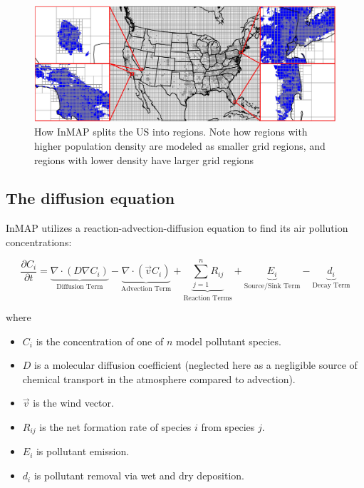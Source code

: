 \documentclass{article}
\begin{document}
\begin{figure}[h]
    \centering
    \includegraphics[width=\textwidth]{inmap.png}
    \caption{How InMAP splits the US into regions. Note how regions with higher population density are modeled as smaller grid
    regions, and regions with lower density have larger grid regions}
    \label{fig:grid}
 \end{figure}

\subsection{The diffusion equation}

InMAP utilizes a reaction-advection-diffusion equation to find its air pollution concentrations:

\begin{equation}
    \frac{\partial C_i}{\partial t} = \underbrace{\nabla \cdot (D\nabla C_i)}_{\text{Diffusion Term}} - \underbrace{\nabla \cdot (\vec{v}C_i)}_{\text{Advection Term}} + \underbrace{\sum_{j=1}^{n} R_{ij}}_{\text{Reaction Terms}} + \underbrace{E_i}_{\text{Source/Sink Term}} - \underbrace{d_i}_{\text{Decay Term}}
\end{equation}
    
where 

\begin{itemize}
    \item $C_i$ is the concentration of one of $n$ model pollutant species.
    \item $D$ is a molecular diffusion coefficient (neglected here as a negligible source of chemical transport in the atmosphere compared to advection).
    \item $\vec{v}$ is the wind vector.
    \item $R_{ij}$ is the net formation rate of species $i$ from species $j$.
    \item $E_i$ is pollutant emission.
    \item $d_i$ is pollutant removal via wet and dry deposition.
\end{itemize}
\end{document}
